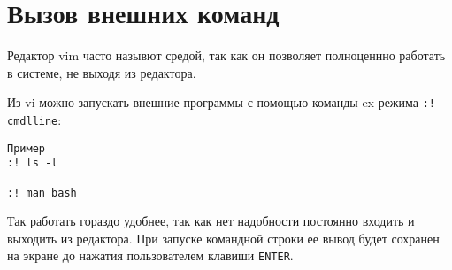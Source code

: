 \section{Вызов внешних команд}

Редактор vim часто назывют средой, так как он позволяет полноценнно работать в системе, не выходя из редактора.

Из vi можно запускать внешние программы с помощью команды ex-режима \verb+:! cmdlline+:
\begin{verbatim}
Пример
:! ls -l

:! man bash
\end{verbatim}

Так работать гораздо удобнее, так как нет надобности постоянно входить и выходить из редактора. При запуске командной строки ее вывод будет сохранен на экране до нажатия пользователем клавиши \verb+ENTER+.

